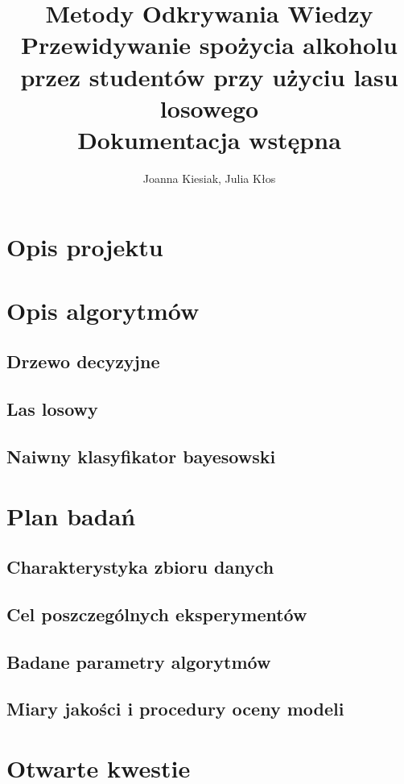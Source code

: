 \documentclass{article}
\title{{\normalfont Metody Odkrywania Wiedzy}\vspace{0.2cm} \\ 
Przewidywanie spożycia alkoholu przez studentów przy użyciu lasu losowego\\
\vspace{0.2cm}
\large{\normalfont Dokumentacja wstępna}}
\author{
Joanna Kiesiak, Julia Kłos\\

}
\begin{document}
\maketitle

\section{Opis projektu}

\section{Opis algorytmów}
\subsection{Drzewo decyzyjne}

\subsection{Las losowy}

\subsection{Naiwny klasyfikator bayesowski}

\section{Plan badań}
\subsection{Charakterystyka zbioru danych}

\subsection{Cel poszczególnych eksperymentów}

\subsection{Badane parametry algorytmów}


\subsection{Miary jakości i procedury oceny modeli}

\section{Otwarte kwestie}



\end{document}
